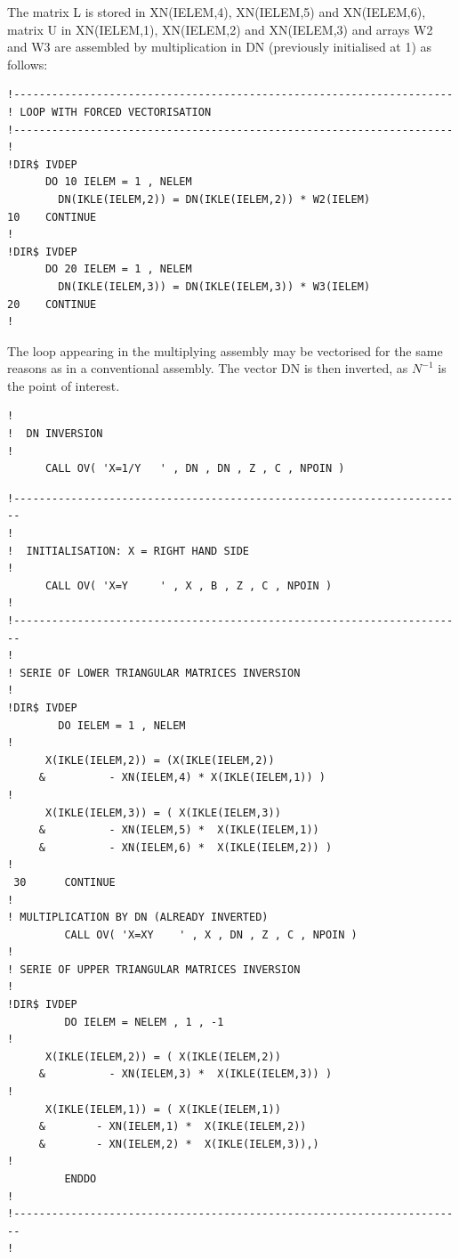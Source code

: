 The matrix L is stored in XN(IELEM,4), XN(IELEM,5) and XN(IELEM,6), matrix U in
XN(IELEM,1), XN(IELEM,2) and XN(IELEM,3) and arrays W2 and W3 are assembled by
multiplication in DN (previously initialised at 1) as follows:

\begin{lstlisting}[language=TelFortran]
!---------------------------------------------------------------------
! LOOP WITH FORCED VECTORISATION
!---------------------------------------------------------------------
!
!DIR$ IVDEP
      DO 10 IELEM = 1 , NELEM
        DN(IKLE(IELEM,2)) = DN(IKLE(IELEM,2)) * W2(IELEM)
10    CONTINUE
!
!DIR$ IVDEP
      DO 20 IELEM = 1 , NELEM
        DN(IKLE(IELEM,3)) = DN(IKLE(IELEM,3)) * W3(IELEM)
20    CONTINUE
!
\end{lstlisting}

The loop appearing in the multiplying assembly may be vectorised for the same
reasons as in a conventional assembly.
The vector DN is then inverted, as $N^{-1}$ is the point of interest.

\begin{lstlisting}[language=TelFortran]
!
!  DN INVERSION
!
      CALL OV( 'X=1/Y   ' , DN , DN , Z , C , NPOIN )
\end{lstlisting}


\begin{lstlisting}[language=TelFortran]
!-----------------------------------------------------------------------
!
!  INITIALISATION: X = RIGHT HAND SIDE
!
      CALL OV( 'X=Y     ' , X , B , Z , C , NPOIN )
!
!-----------------------------------------------------------------------
!
! SERIE OF LOWER TRIANGULAR MATRICES INVERSION
!
!DIR$ IVDEP
        DO IELEM = 1 , NELEM
!
      X(IKLE(IELEM,2)) = (X(IKLE(IELEM,2))
     &          - XN(IELEM,4) * X(IKLE(IELEM,1)) )
!
      X(IKLE(IELEM,3)) = ( X(IKLE(IELEM,3))
     &          - XN(IELEM,5) *  X(IKLE(IELEM,1))
     &          - XN(IELEM,6) *  X(IKLE(IELEM,2)) )
!
 30      CONTINUE
!
! MULTIPLICATION BY DN (ALREADY INVERTED)
         CALL OV( 'X=XY    ' , X , DN , Z , C , NPOIN )
!
! SERIE OF UPPER TRIANGULAR MATRICES INVERSION
!
!DIR$ IVDEP
         DO IELEM = NELEM , 1 , -1
!
      X(IKLE(IELEM,2)) = ( X(IKLE(IELEM,2))
     &          - XN(IELEM,3) *  X(IKLE(IELEM,3)) )
!
      X(IKLE(IELEM,1)) = ( X(IKLE(IELEM,1))
     &        - XN(IELEM,1) *  X(IKLE(IELEM,2))
     &        - XN(IELEM,2) *  X(IKLE(IELEM,3)),)
!
         ENDDO
!
!-----------------------------------------------------------------------
!
\end{lstlisting}

